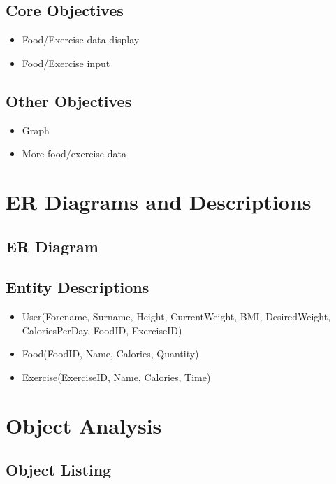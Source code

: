 \subsection{Core Objectives}

\begin{itemize}
\item Food/Exercise data display
\item Food/Exercise input
\end{itemize}

\subsection{Other Objectives}

\begin{itemize}
\item Graph
\item More food/exercise data
\end{itemize}


\section{ER Diagrams and Descriptions}

\subsection{ER Diagram}

\subsection{Entity Descriptions}

\begin{itemize}
\item User(Forename, Surname, Height, CurrentWeight, BMI, DesiredWeight, CaloriesPerDay, FoodID, ExerciseID)
\item Food(FoodID, Name, Calories, Quantity)
\item Exercise(ExerciseID, Name, Calories, Time)
\end{itemize}

\section{Object Analysis}

\subsection{Object Listing}

